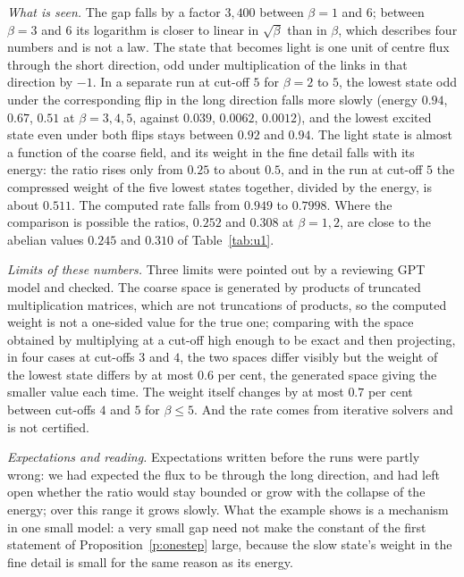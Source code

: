 \emph{What is seen.} The gap falls by a factor $3{,}400$ between $\beta=1$ and $6$; between $\beta=3$ and $6$ its logarithm is closer
to linear in $\sqrt\beta$ than in $\beta$, which describes four numbers and is not a law. The state that
becomes light is one unit of centre flux through the short direction, odd under multiplication of the links
in that direction by $-1$. In a separate run at cut-off $5$ for $\beta=2$ to $5$, the lowest state odd under
the corresponding flip in the long direction falls more slowly (energy $0.94$, $0.67$, $0.51$ at
$\beta=3,4,5$, against $0.039$, $0.0062$, $0.0012$), and the lowest excited state even under both flips stays
between $0.92$ and $0.94$. The light state is almost a function of the coarse field, and its weight in the
fine detail falls with its energy: the ratio rises only from $0.25$ to about $0.5$, and in the run at
cut-off $5$ the compressed weight of the five lowest states together, divided by the energy, is about
$0.511$. The computed rate falls from $0.949$ to $0.7998$. Where the comparison is possible the ratios,
$0.252$ and $0.308$ at $\beta=1,2$, are close to the abelian values $0.245$ and $0.310$ of
Table~\ref{tab:u1}.

\emph{Limits of these numbers.} Three limits were pointed out by a reviewing GPT model and checked. The coarse space is
generated by products of truncated multiplication matrices, which are not truncations of products, so the
computed weight is not a one-sided value for the true one; comparing with the space obtained by multiplying
at a cut-off high enough to be exact and then projecting, in four cases at cut-offs $3$ and $4$, the two
spaces differ visibly but the weight of the lowest state differs by at most $0.6$ per cent, the generated
space giving the smaller value each time. The weight itself changes by at most $0.7$ per cent between
cut-offs $4$ and $5$ for $\beta\le5$. And the rate comes from iterative solvers and is not certified.

\emph{Expectations and reading.} Expectations written before the runs were partly wrong: we had expected the flux to be through the long
direction, and had left open whether the ratio would stay bounded or grow with the collapse of the energy;
over this range it grows slowly. What the example shows is a mechanism in one small model: a very small gap
need not make the constant of the first statement of Proposition~\ref{p:onestep} large, because the slow
state's weight in the fine detail is small for the same reason as its energy.

